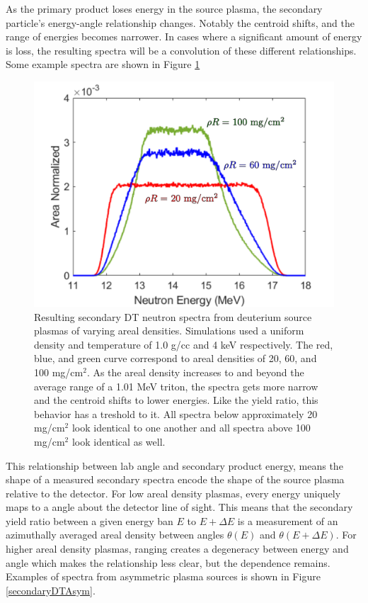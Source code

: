 	As the primary product loses energy in the source plasma, the secondary particle's energy-angle relationship changes. Notably the centroid shifts, and the range of energies becomes narrower. In cases where a significant amount of energy is loss, the resulting spectra will be a convolution of these different relationships. Some example spectra are shown in Figure \ref{secondarySpectra_rhoR}
	
	\begin{figure}[h!]
		\centering
		\includegraphics[scale=0.6]{Figures/secondarySpectra_rhoR.pdf}
		\caption[Secondary DT neutron spectra for varying areal densities]{Resulting secondary DT neutron spectra from deuterium source plasmas of varying areal densities. Simulations used a uniform density and temperature of 1.0 g/cc and 4 keV respectively. The red, blue, and green curve correspond to areal densities of 20, 60, and 100 mg/cm$^2$. As the areal density increases to and beyond the average range of a 1.01 MeV triton, the spectra gets more narrow and the centroid shifts to lower energies. Like the yield ratio, this behavior has a treshold to it. All spectra below approximately 20 mg/cm$^2$ look identical to one another and all spectra above 100 mg/cm$^2$ look identical as well.}
		\label{secondarySpectra_rhoR}
	\end{figure}
		
	This relationship between lab angle and secondary product energy, means the shape of a measured secondary spectra encode the shape of the source plasma relative to the detector. For low areal density plasmas, every energy uniquely maps to a angle about the detector line of sight. This means that the secondary yield ratio between a given energy ban $E$ to $E+\Delta E$ is a measurement of an azimuthally averaged areal density between angles $\theta(E)$ and $\theta(E+\Delta E)$. For higher areal density plasmas, ranging creates a degeneracy between energy and angle which makes the relationship less clear, but the dependence remains. Examples of spectra from asymmetric plasma sources is shown in Figure \ref{secondaryDTAsym}.
	
